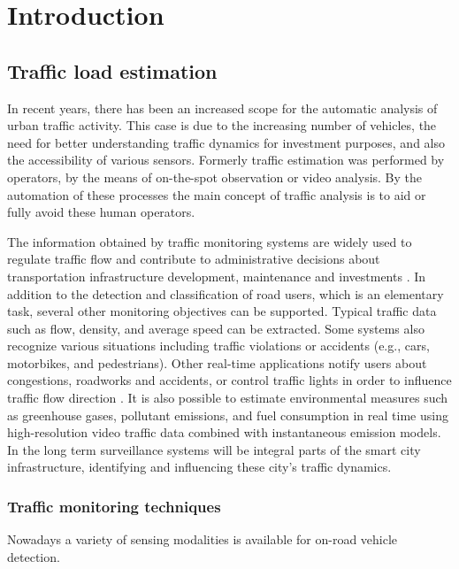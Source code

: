 \chapter*{Introduction}
\section{Traffic load estimation}
In recent years, there has been an increased scope for the automatic analysis of urban traffic activity\cite{Buch2011}.
This case is due to the increasing number of vehicles, the need for better understanding traffic dynamics for investment purposes, and also the accessibility of various sensors.
Formerly traffic estimation was performed by operators, by the means of on-the-spot observation or video analysis.
By the automation of these processes the main concept of traffic analysis is to aid or fully avoid these human operators.

The information obtained by traffic monitoring systems are widely used to regulate traffic flow and contribute to administrative decisions about transportation infrastructure development, maintenance and investments \cite{MagyarKozut}.
In addition to the detection and classification of road users, which is an elementary task, several other monitoring objectives can be supported. 
Typical traffic data such as flow, density, and average speed can be extracted.
Some systems also recognize various situations including traffic violations or accidents (e.g., cars, motorbikes, and pedestrians).
Other real-time applications notify users about congestions, roadworks and accidents, or control traffic lights in order to influence traffic flow direction \cite{AzoSensor, Thiruverahan2015, Ghazal2016}.
It is also possible to estimate environmental measures such as greenhouse gases, pollutant emissions, and fuel consumption in real time using high-resolution video traffic data combined with instantaneous emission models\cite{Morris2012a}. 
In the long term surveillance systems will be integral parts of the smart city infrastructure, identifying and influencing these city's traffic dynamics\cite{enLight}.

\subsection{Traffic monitoring techniques}
Nowadays a variety of sensing modalities is available for on-road vehicle detection.

